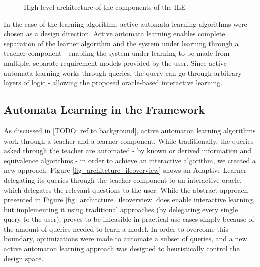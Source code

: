 \begin{figure}[!ht] 
	\centering
	\caption{High-level architecture of the components of the ILE} 
	\label{fig_architcture_informaloverview}
\end{figure}

 In the case of the learning algorithm, active automata learning algorithms were chosen as a design direction. Active automata learning enables complete separation of the learner algorithm and the system under learning through a teacher component - enabling the system under learning to be made from multiple, separate requirement-models provided by the user. Since active automata learning works through queries, the query can go through arbitrary layers of logic - allowing the proposed oracle-based interactive learning. 

\subsection{Automata Learning in the Framework} \label{subs_automatalearningintheframework}
As discussed in [TODO: ref to background], active automaton learning algorithms work through a teacher and a learner component. While traditionally, the queries asked through the teacher are automated - by known or derived information and equivalence algorithms - in order to achieve an interactive algorithm, we created a new approach. Figure \ref{fig_architcture_ileoverview} shows an Adaptive Learner delegating its queries through the teacher  component to an interactive oracle, which delegates the relevant questions to the user. While the abstract approach presented in Figure \ref{fig_architcture_ileoverview} does enable interactive learning, but implementing it using traditional approaches (by delegating every single query to the user), proves to be infeasible in practical use cases simply because of the amount of queries needed to learn a model. In order to overcome this boundary, optimizations were made to automate a subset of queries, and a new active automaton learning approach was designed to heuristically control the design space.


